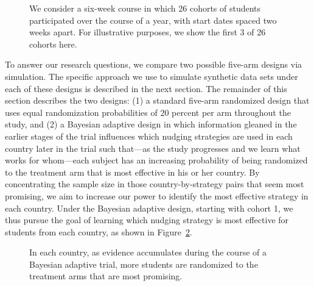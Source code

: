 \documentclass{acm_proc_article-sp}
\begin{document}
\begin{figure}
\centering
{}
\caption{We consider a six-week course in which 26 cohorts of students participated over the course of a year, with start dates spaced two weeks apart. For illustrative purposes, we show the first 3 of 26 cohorts here.}
\label{fig:timeline}
\end{figure}

To answer our research questions, we compare two possible five-arm designs via simulation. 
The specific approach we use to simulate synthetic data sets under each of these designs is described in the next section. 
The remainder of this section describes the two designs: (1) a standard five-arm randomized design that uses equal randomization probabilities of 20 percent per arm throughout the study, and (2) a Bayesian adaptive design in which information gleaned in the earlier stages of the trial influences which nudging strategies are used in each country later in the trial such that---as the study progresses and we learn what works for whom---each subject has an increasing probability of being randomized to the treatment arm that is most effective in his or her country. 
By concentrating the sample size in those country-by-strategy pairs that seem most promising, we aim to increase our power to identify the most effective strategy in each country. 
Under the Bayesian adaptive design, starting with cohort 1, we thus pursue the goal of learning which nudging strategy is most effective for students from each country, as shown in Figure~\ref{fig:timeline2}. 

\begin{figure}
\centering
{}
\caption{In each country, as evidence accumulates during the course of a Bayesian adaptive trial, more students are randomized to the treatment arms that are most promising.}
\label{fig:timeline2}
{}
\end{figure}
\end{document}
